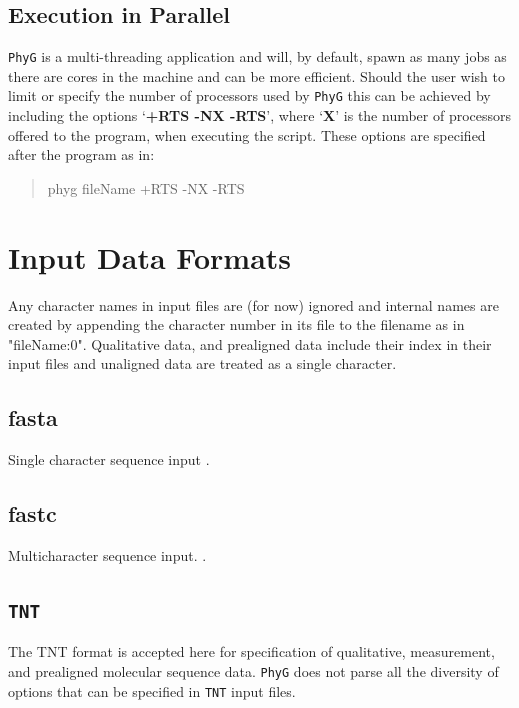 \documentclass[11pt]{book}
\newcommand{\phyg}{\texttt{PhyG} }
\begin{document}
{{%
	
	\subsection{Execution in Parallel}
		\label{subsec:parallel}
		\phyg is a multi-threading application and will, by default, spawn as many jobs as there 
		are cores in the machine and can be more efficient. Should the user wish to limit or 
		specify the number of processors used by \phyg this can be achieved by including the options 
		`\textbf{+RTS -NX -RTS}', where `\textbf{X}' is the number of processors offered to the 
		program, when executing the script. These options are specified after the program as in:
		
		\begin{quote}
		phyg fileName +RTS -NX -RTS 
		\end{quote}
		

		
	\section{Input Data Formats} 
	Any character names in input files are (for now) ignored and internal names are created
	by appending the character number in its file to the filename as in "fileName:0".
	Qualitative data, and prealigned data include their index in their input files and unaligned 
	data are treated as a single character.
		
		\subsection{fasta}
		Single character sequence input \citep{PearsonandLipman1988}.
		
		\subsection{fastc}
		Multicharacter sequence input. \citep{WheelerandWashburn2019}.
		
		\subsection{\texttt{TNT}}
		The TNT \citep{Goloboffetal2008} format is accepted here for specification of qualitative,
		measurement, and prealigned molecular sequence data. \phyg does not parse all the
		diversity of options that can be specified in \texttt{TNT} input files.\\
		
}}
\end{document}
